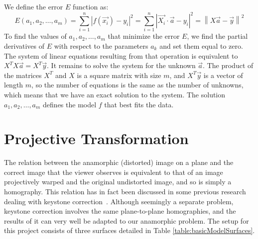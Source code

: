 \documentclass[11pt, oneside, reqno]{book}
\begin{document}
We define the error $E$ function as:
\[
E(a_1, a_2, \dots, a_m) 
= \sum_{i=1}^n \left|f(\vec{x_i}) - y_i\right|^2 
= \sum_{i=1}^n \left| \vec{X_i}\cdot \vec{a} - y_i \right|^2
= \left\| X\vec{a} - \vec{y} \right\|^2
\]
To find the values of $a_1, a_2, \dots, a_m$ that minimize the error  $E$, we find the partial derivatives of $E$ with respect to the parameters $a_k$ and set them equal to zero. %
The system of linear equations resulting from that operation is equivalent to $X^T X \vec{a} = X^T \vec{y}$. 
It remains to solve the system for the unknown $\vec{a}$. The product of the matrices $X^T$ and $X$ is a square matrix with size $m$, and $X^T \vec{y}$ is a vector of length $m$, so the number of equations is the same as the number of unknowns, which means that we have an exact solution to the system. The solution $a_1, a_2, \dots, a_m$ defines the model $f$ that best fits the data.












\section{Projective Transformation}
\label{sec:projectiveTransform}

The relation between the anamorphic (distorted) image on a plane and the correct image that the viewer observes is equivalent to that of an image projectively warped and the original undistorted image, and so is simply a homography. This relation has in fact been discussed in some previous research dealing with keystone correction~\cite{sukthankar2001smarter}. Although seemingly a separate problem, keystone correction involves the same plane-to-plane homographies, and the results of it can very well be adapted to our anamorphic problem.
The setup for this project consists of three surfaces detailed in Table \ref{table:basicModelSurfaces}.
\end{document}
